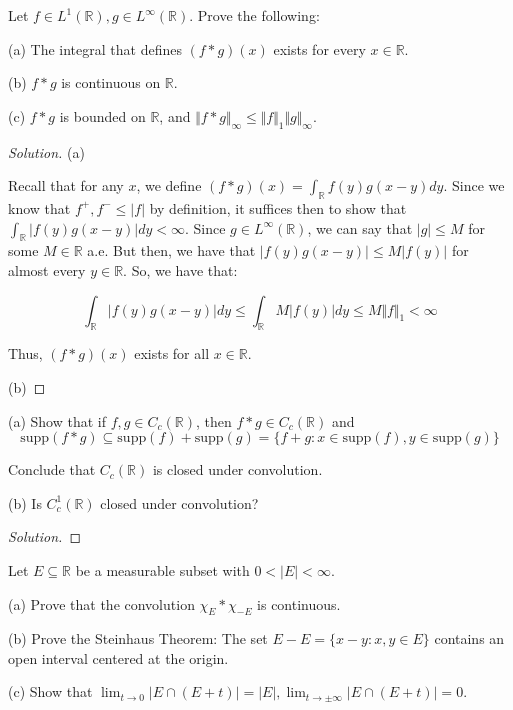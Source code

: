 \documentclass[10pt]{article}
\newcommand{\supp}{{\text{supp}}}
\newenvironment{problem}[2][Problem]{\begin{trivlist}
\item[\hskip \labelsep {\bfseries #1}\hskip \labelsep {\bfseries #2.}]}{\end{trivlist}}
\begin{document}
\begin{problem}{4.6.27}

Let $f \in L^1(\mathbb{R}), g \in L^\infty(\mathbb{R})$. Prove the following:

(a) The integral that defines $(f \ast g)(x)$ exists for every $x \in \mathbb{R}$.

(b) $f \ast g$ is continuous on $\mathbb{R}$.

(c) $f \ast g$ is bounded on $\mathbb{R}$, and $\Vert f \ast g \Vert_\infty \leq \Vert f \Vert_1 \Vert g \Vert_\infty$.

\end{problem}
\begin{proof}[Solution]

(a)

Recall that for any $x$, we define $(f \ast g)(x) = \int_{\mathbb{R}} f(y)g(x-y) dy$. Since we know that $f^+, f^- \leq |f|$ by definition, it suffices then to show that $\int_{\mathbb{R}} |f(y)g(x-y)| dy < \infty$. Since $g \in L^\infty(\mathbb{R})$, we can say that $|g| \leq M$ for some $M \in \mathbb{R}$ a.e.  But then, we have that $|f(y)g(x-y)| \leq M|f(y)|$ for almost every $y \in \mathbb{R}$. So, we have that:

$$ \int_{\mathbb{R}} |f(y)g(x-y)| dy \leq \int_{\mathbb{R}} M|f(y)| dy \leq M \Vert f \Vert_1 < \infty$$

Thus, $(f \ast g)(x)$ exists for all $x \in \mathbb{R}$.

(b)



\end{proof}

\begin{problem}{4.6.28}

(a) Show that if $f,g \in C_c(\mathbb{R})$, then $f \ast g \in C_c(\mathbb{R})$ and $$\supp(f \ast g) \subseteq \supp(f) + \supp(g) = \{ f + g : x \in \supp(f), y \in \supp(g) \}$$

Conclude that $C_c(\mathbb{R})$ is closed under convolution.

(b) Is $C_c^1(\mathbb{R})$ closed under convolution?

\end{problem}

\begin{proof}[Solution]


\end{proof}

\begin{problem}{4.6.29}

Let $E \subseteq \mathbb{R}$ be a measurable subset with $0 < |E| < \infty$.

(a) Prove that the convolution $\chi_E \ast \chi_{-E}$ is continuous.

(b) Prove the Steinhaus Theorem: The set $E - E = \{ x - y : x,y \in E\}$ contains an open interval centered at the origin.

(c) Show that $\lim_{t \to 0} | E \cap (E + t)| = |E|, \lim_{t \to \pm \infty} |E \cap (E + t)| = 0$.

\end{problem}
\end{document}
